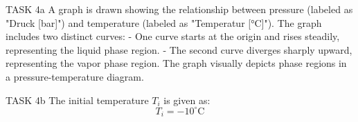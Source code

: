 TASK 4a  
A graph is drawn showing the relationship between pressure (labeled as "Druck [bar]") and temperature (labeled as "Temperatur [°C]"). The graph includes two distinct curves:  
- One curve starts at the origin and rises steadily, representing the liquid phase region.  
- The second curve diverges sharply upward, representing the vapor phase region.  
The graph visually depicts phase regions in a pressure-temperature diagram.

TASK 4b  
The initial temperature \( T_i \) is given as:  
\[
T_i = -10^\circ\text{C}
\]